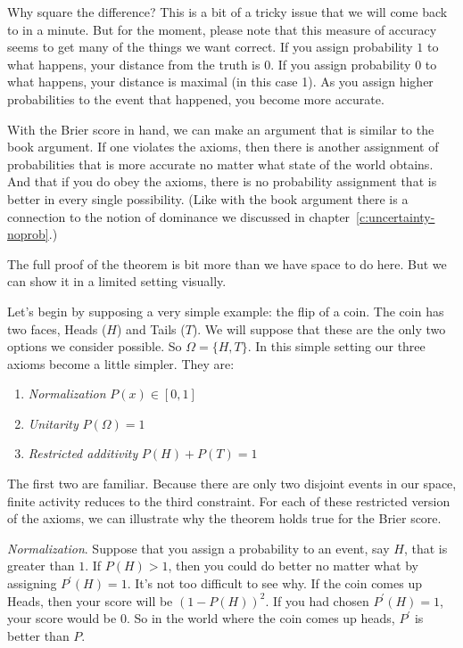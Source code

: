 Why square the difference? This is a bit of a tricky issue that we will come back to in a minute.  But for the moment, please note that this measure of accuracy seems to get many of the things we want correct.  If you assign probability $1$ to what happens, your distance from the truth is $0$.  If you assign probability 0 to what happens, your distance is maximal (in this case 1).  As you assign higher probabilities to the event that happened, you become more accurate. 

With the Brier score in hand, we can make an argument that is similar to the book argument. If one violates the axioms, then there is another assignment of probabilities that is more accurate no matter what state of the world obtains.  And that if you do obey the axioms, there is no probability assignment that is better in every single possibility.  (Like with the book argument there is a connection to the notion of dominance we discussed in chapter~\ref{c:uncertainty-noprob}.)

The full proof of the theorem is bit more than we have space to do here.  But we can show it in a limited setting visually. 

Let's begin by supposing a very simple example: the flip of a coin.  The coin has two faces, Heads ($H$) and Tails ($T$).  We will suppose that these are the only two options we consider possible.  So $\Omega = \{H, T\}$.  In this simple setting our three axioms become a little simpler.  They are:

\begin{enumerate}
    \item {\it Normalization} $P(x) \in [0,1]$
    \item {\it Unitarity} $P(\Omega) = 1$
    \item {\it Restricted additivity} $P(H) + P(T) = 1$
\end{enumerate}

The first two are familiar.  Because there are only two disjoint events in our space, finite activity reduces to the third constraint.  For each of these restricted version of the axioms, we can illustrate why the theorem holds true for the Brier score.

{\it Normalization}.  Suppose that you assign a probability to an event, say $H$, that is greater than $1$.  If $P(H) > 1$, then you could do better no matter what by assigning $P^\prime(H) = 1$.  It's not too difficult to see why.  If the coin comes up Heads, then your score will be $(1 - P(H))^2$.  If you had chosen $P^\prime(H) = 1$, your score would be 0.  So in the world where the coin comes up heads, $P^\prime$ is better than $P$.  

